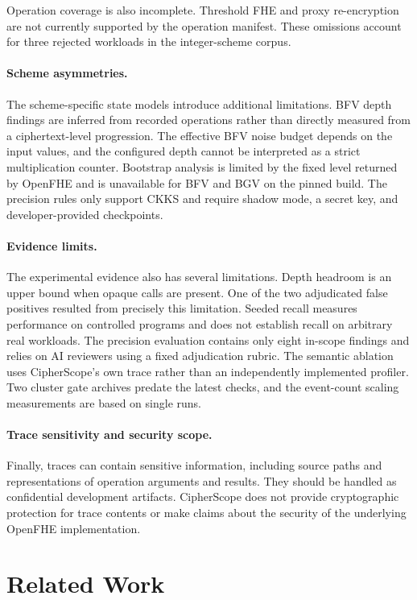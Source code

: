 \documentclass[pdflatex,sn-basic,Numbered,iicol]{sn-jnl}
\begin{document}
Operation coverage is also incomplete. Threshold FHE and proxy re-encryption
are not currently supported by the operation manifest. These omissions
account for three rejected workloads in the integer-scheme corpus.

\paragraph{Scheme asymmetries.} The scheme-specific state models introduce
additional limitations. BFV depth findings are inferred from recorded
operations rather than directly measured from a ciphertext-level progression.
The effective BFV noise budget depends on the input values, and the
configured depth cannot be interpreted as a strict multiplication counter.
Bootstrap analysis is limited by the fixed level returned by OpenFHE and is
unavailable for BFV and BGV on the pinned build. The precision rules only
support CKKS and require shadow mode, a secret key, and developer-provided
checkpoints.

\paragraph{Evidence limits.} The experimental evidence also has several
limitations. Depth headroom is an upper bound when opaque calls are present.
One of the two adjudicated false positives resulted from precisely this
limitation. Seeded recall measures performance on controlled programs and
does not establish recall on arbitrary real workloads. The precision
evaluation contains only eight in-scope findings and relies on AI reviewers
using a fixed adjudication rubric. The semantic ablation uses CipherScope's
own trace rather than an independently implemented profiler. Two cluster gate
archives predate the latest checks, and the event-count scaling measurements
are based on single runs.

\paragraph{Trace sensitivity and security scope.} Finally, traces can contain
sensitive information, including source paths and representations of
operation arguments and results. They should be handled as confidential
development artifacts. CipherScope does not provide cryptographic protection
for trace contents or make claims about the security of the underlying
OpenFHE implementation.

\section{Related Work}
\label{sec:related}
\end{document}
